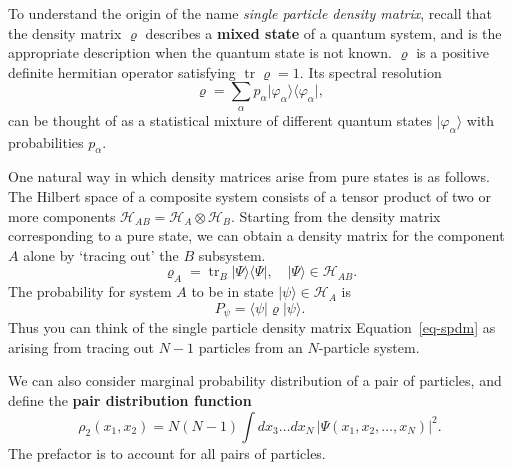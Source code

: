 \documentclass[
  letterpaper,
  DIV=11,
  numbers=noendperiod]{scrreprt}
\begin{document}
\begin{tcolorbox}[enhanced jigsaw, colback=white, bottomrule=.15mm, left=2mm, colbacktitle=quarto-callout-note-color!10!white, breakable, colframe=quarto-callout-note-color-frame, leftrule=.75mm, opacitybacktitle=0.6, opacityback=0, bottomtitle=1mm, toptitle=1mm, titlerule=0mm, title=\textcolor{quarto-callout-note-color}{\faInfo}\hspace{0.5em}{Note}, toprule=.15mm, arc=.35mm, coltitle=black, rightrule=.15mm]

To understand the origin of the name \emph{single particle density
matrix}, recall that the density matrix \(\varrho\) describes a
\textbf{mixed state} of a quantum system, and is the appropriate
description when the quantum state is not known. \(\varrho\) is a
positive definite hermitian operator satisfying
\(\mathop{\mathrm{tr}}\varrho =1\). Its spectral resolution \[
\varrho = \sum_\alpha p_\alpha \lvert{\varphi_\alpha}\rangle\langle{\varphi_\alpha}\rvert,
\] can be thought of as a statistical mixture of different quantum
states \(\lvert{\varphi_\alpha}\rangle\) with probabilities
\(p_\alpha\).

One natural way in which density matrices arise from pure states is as
follows. The Hilbert space of a composite system consists of a tensor
product of two or more components
\(\mathcal{H}_{AB} = \mathcal{H}_A \otimes \mathcal{H}_B\). Starting
from the density matrix corresponding to a pure state, we can obtain a
density matrix for the component \(A\) alone by `tracing out' the \(B\)
subsystem. \[
\varrho_A = \mathop{\mathrm{tr}}_B \lvert{\Psi}\rangle\langle{\Psi}\rvert,\quad \lvert{\Psi}\rangle\in \mathcal{H}_{AB}.
\] The probability for system \(A\) to be in state
\(\lvert{\psi}\rangle\in \mathcal{H}_A\) is \[
P_\psi = \langle{\psi}\rvert\varrho\lvert{\psi}\rangle.
\] Thus you can think of the single particle density matrix
Equation~\ref{eq-spdm} as arising from tracing out \(N-1\) particles
from an \(N\)-particle system.

We can also consider marginal probability distribution of a pair of
particles, and define the \textbf{pair distribution function} \[
\rho_2(x_1,x_2) = N(N-1) \int dx_3\ldots dx_N \,\left|\Psi(x_1,x_2,\ldots,x_N)\right|^2.
\] The prefactor is to account for all pairs of particles.

\end{tcolorbox}
\end{document}
